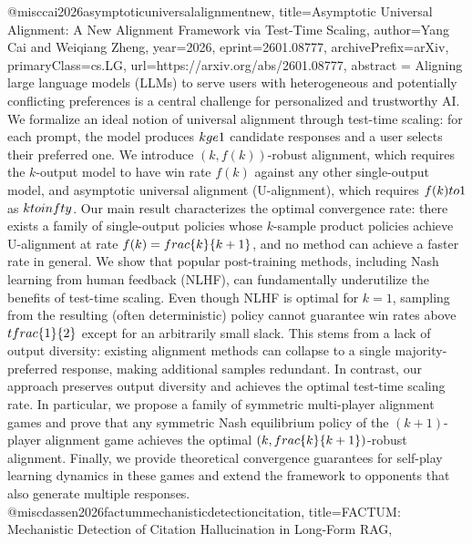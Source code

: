 {}@misc{cai2026asymptoticuniversalalignmentnew,
      title={Asymptotic Universal Alignment: A New Alignment Framework via Test-Time Scaling}, 
      author={Yang Cai and Weiqiang Zheng},
      year={2026},
      eprint={2601.08777},
      archivePrefix={arXiv},
      primaryClass={cs.LG},
      url={https://arxiv.org/abs/2601.08777},
      abstract = {Aligning large language models (LLMs) to serve users with heterogeneous and potentially conflicting preferences is a central challenge for personalized and trustworthy AI. We formalize an ideal notion of universal alignment through test-time scaling: for each prompt, the model produces $k\\ge 1$ candidate responses and a user selects their preferred one. We introduce $(k,f(k))$-robust alignment, which requires the $k$-output model to have win rate $f(k)$ against any other single-output model, and asymptotic universal alignment (U-alignment), which requires $f(k)\\to 1$ as $k\\to\\infty$. Our main result characterizes the optimal convergence rate: there exists a family of single-output policies whose $k$-sample product policies achieve U-alignment at rate $f(k)=\\frac\{k\}\{k+1\}$, and no method can achieve a faster rate in general.   We show that popular post-training methods, including Nash learning from human feedback (NLHF), can fundamentally underutilize the benefits of test-time scaling. Even though NLHF is optimal for $k=1$, sampling from the resulting (often deterministic) policy cannot guarantee win rates above $\\tfrac\{1\}\{2\}$ except for an arbitrarily small slack. This stems from a lack of output diversity: existing alignment methods can collapse to a single majority-preferred response, making additional samples redundant. In contrast, our approach preserves output diversity and achieves the optimal test-time scaling rate. In particular, we propose a family of symmetric multi-player alignment games and prove that any symmetric Nash equilibrium policy of the $(k+1)$-player alignment game achieves the optimal $(k,\\frac\{k\}\{k+1\})$-robust alignment. Finally, we provide theoretical convergence guarantees for self-play learning dynamics in these games and extend the framework to opponents that also generate multiple responses.}
}@misc{dassen2026factummechanisticdetectioncitation,
      title={FACTUM: Mechanistic Detection of Citation Hallucination in Long-Form RAG}, 
}
